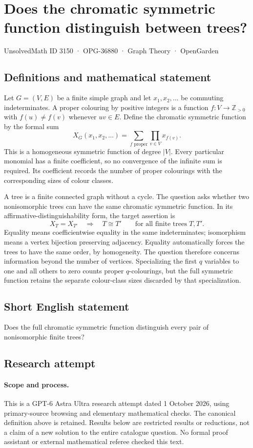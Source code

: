 \documentclass[11pt,a4paper]{article}
\begin{document}
\section*{Does the chromatic symmetric function distinguish between trees?}\label{3150}
{\small UnsolvedMath ID 3150 · OPG-36880 · Graph Theory · OpenGarden}
\subsection{Definitions and mathematical statement}
Let $G=(V,E)$ be a finite simple graph and let
$x_1,x_2,\ldots$ be commuting indeterminates. A proper colouring by
positive integers is a function $f:V\to\mathbb Z_{>0}$ with
$f(u)\neq f(v)$ whenever $uv\in E$. Define the chromatic symmetric
function by the formal sum
\[
 X_G(x_1,x_2,\ldots)
   =\sum_{f\text{ proper}}\prod_{v\in V}x_{f(v)}.
\]
This is a homogeneous symmetric function of degree $|V|$. Every
particular monomial has a finite coefficient, so no convergence
of the infinite sum is required. Its coefficient records the
number of proper colourings with the corresponding sizes of
colour classes.

A tree is a finite connected graph without a cycle. The question
asks whether two nonisomorphic trees can have the same chromatic
symmetric function. In its affirmative-distinguishability form,
the target assertion is
\[
 X_T=X_{T'}\quad\Longrightarrow\quad T\cong T'
 \qquad\text{for all finite trees }T,T'.
\]
Equality means coefficientwise equality in the same indeterminates;
isomorphism means a vertex bijection preserving adjacency. Equality
automatically forces the trees to have the same order, by
homogeneity. The question therefore concerns information beyond
the number of vertices. Specializing the first $q$ variables to
one and all others to zero counts proper $q$-colourings, but the
full symmetric function retains the separate colour-class sizes
discarded by that specialization.
\subsection{Short English statement}
Does the full chromatic symmetric function distinguish every pair of nonisomorphic finite trees?
\subsection{Research attempt}
\paragraph{Scope and process.}
This is a GPT-6 Astra Ultra research attempt dated 1 October 2026, using
primary-source browsing and elementary mathematical checks. The canonical
definition above is retained. Results below are restricted results or
reductions, not a claim of a new solution to the entire catalogue question.
No formal proof assistant or external mathematical referee checked this text.
\end{document}
